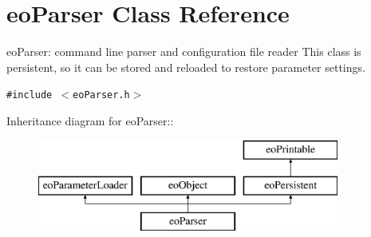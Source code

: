 \section{eo\-Parser Class Reference}
\label{classeo_parser}
eo\-Parser: command line parser and configuration file reader This class is persistent, so it can be stored and reloaded to restore parameter settings.  


{\tt \#include $<$eo\-Parser.h$>$}

Inheritance diagram for eo\-Parser::\begin{figure}[H]
\begin{center}
\leavevmode
\includegraphics[height=3cm]{classeo_parser}
\end{center}
\end{figure}
